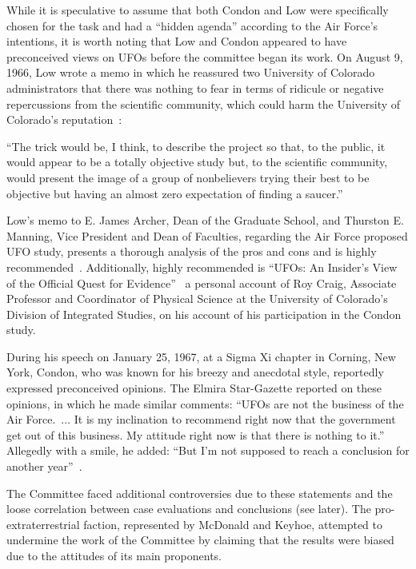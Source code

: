 While it is speculative to assume that both Condon and Low were specifically chosen for the task and had a ``hidden agenda'' according to the Air Force's intentions, it is worth noting that Low and Condon appeared to have preconceived views on UFOs before the committee began its work. On August 9, 1966, Low wrote a memo in which he reassured two University of Colorado administrators that there was nothing to fear in terms of ridicule or negative repercussions from the scientific community, which could harm the University of Colorado's reputation~\cite[pp.~33,34]{Hoyt2000Apr}:
\begin{svgraybox}
``The trick would be, I think, to describe the project so that, to
the public, it would appear to be a totally objective study but, to the scientific community,
would present the image of a group of nonbelievers trying their best to be objective but
having an almost zero expectation of finding a saucer.''
\end{svgraybox}
Low's memo to E. James Archer, Dean of the Graduate School, and Thurston E. Manning, Vice President and Dean of Faculties,
regarding the Air Force proposed UFO study, presents a thorough analysis of the pros and cons and is highly recommended~\cite[pp.~33,34]{Hoyt2000Apr}.
Additionally, highly recommended is ``UFOs: An Insider's View of the Official Quest for Evidence''~\cite{CraigCondon1995}
a personal account of Roy Craig,
Associate Professor and Coordinator of Physical Science
at the University of Colorado's Division of Integrated Studies,
on his account of his participation in the Condon study.

During his speech on January 25, 1967, at a Sigma Xi chapter in Corning, New York, Condon, who was known for his breezy and anecdotal style, reportedly expressed preconceived opinions. The Elmira Star-Gazette reported on these opinions, in which he made similar comments:
``UFOs are not the business of the Air Force.~$\ldots$
It is my inclination to recommend right now that the government get out of this business.
My attitude right now is that there is nothing to it.'' Allegedly with a smile, he added:
``But I'm not supposed to reach a conclusion for another year''~\cite{Hoyt2000Apr,Fuller1968}.

The Committee faced additional controversies due to these statements and the loose correlation between case evaluations and conclusions (see later).
The pro-extraterrestrial faction, represented by McDonald and Keyhoe, attempted to undermine the work of the Committee by claiming that the results were biased due to the attitudes of its main proponents.

